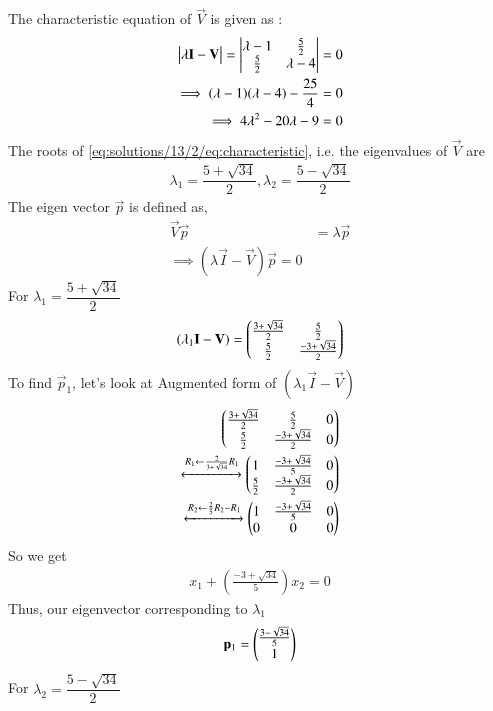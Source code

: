 The characteristic equation of $\vec{V}$ is given as :
\begin{align}
    \begin{vmatrix}\lambda\mathbf{I}-\mathbf{V}\end{vmatrix} = \begin{vmatrix}\lambda - 1 & \frac{5}{2} \\ \frac{5}{2} & \lambda - 4\end{vmatrix} = 0\\
    \implies (\lambda - 1)(\lambda - 4) - \dfrac{25}{4} = 0\\
    \label{eq:solutions/13/2/eq:characteristic}\implies 4\lambda^2-20\lambda-9 = 0
\end{align}
The roots of \eqref{eq:solutions/13/2/eq:characteristic}, i.e. the eigenvalues of $\vec{V}$ are
\begin{align}
    \lambda_1 = \dfrac{5+\sqrt{34}}{2}, \lambda_2 = \dfrac{5-\sqrt{34}}{2}\label{eq:solutions/13/2/eq:eigenval}
\end{align}
The eigen vector $\vec{p}$ is defined as, 
\begin{align}
    \vec{V}\vec{p} &= \lambda\vec{p}\\
    \implies(\lambda\vec{I}-\vec{V})\vec{p}=0
\end{align}
For $\lambda_1=\dfrac{5+\sqrt{34}}{2}$
\begin{align}
    (\lambda_1\mathbf{I}-\mathbf{V}) = \begin{pmatrix}\frac{3+\sqrt{34}}{2} & \frac{5}{2} \\ \frac{5}{2} & \frac{-3 +\sqrt{34}}{2}\end{pmatrix}
\end{align}
To find $\vec{p}_1$, let's look at Augmented form of $(\lambda_1\vec{I}-\vec{V})$
\begin{align}
    \begin{pmatrix}\frac{3+\sqrt{34}}{2} & \frac{5}{2} & 0 \\ \frac{5}{2} & \frac{-3 +\sqrt{34}}{2} & 0\end{pmatrix}\\\xleftrightarrow{R_1 \leftarrow \frac{2}{3+\sqrt{34}}R_1}\begin{pmatrix}1 & \frac{-3+\sqrt{34}}{5} & 0 \\ \frac{5}{2} & \frac{-3 +\sqrt{34}}{2} & 0\end{pmatrix}\\\xleftrightarrow{R_2\leftarrow \frac{2}{5}R_2 - R_1}\begin{pmatrix}1 & \frac{-3+\sqrt{34}}{5} & 0 \\ 0&0&0\end{pmatrix}
\end{align}
So we get
\begin{align}
    x_1 + \left(\frac{-3+\sqrt{34}}{5}\right) x_2 = 0
\end{align}
Thus, our eigenvector corresponding to $\lambda_1$
\begin{align}
    \mathbf{p}_1 = \begin{pmatrix}\frac{3-\sqrt{34}}{5} \\ 1\end{pmatrix}
\end{align}
For $\lambda_2=\dfrac{5-\sqrt{34}}{2}$
